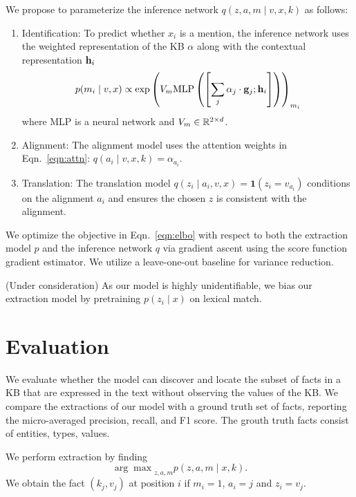 \documentclass[12pt]{article}
\begin{document}
We propose to parameterize the inference network $q(z,a,m\mid v,x,k)$ as follows:
\begin{enumerate}
\item Identification: To predict whether $x_i$ is a mention,
    the inference network uses the weighted representation of the KB $\alpha$
    along with the contextual representation $\mathbf{h}_i$
    \begin{equation}
    p(m_i \mid v,x) \propto
    \exp\left(V_m
    \textrm{MLP}\left(\left[\sum_j \alpha_j \cdot \mathbf{g}_j; \mathbf{h}_i\right]\right)\right)_{m_i}
    \end{equation}
    where MLP is a neural network and $V_m \in \mathbb{R}^{2 \times d}$.
\item Alignment: The alignment model uses the attention weights in Eqn.~\ref{eqn:attn}:
    $q(a_i \mid v,x,k) = \alpha_{a_i}$.
\item Translation: The translation model
    $q(z_i \mid a_i,v,x) = \mathbf{1}(z_i = v_{a_i})$
    conditions on the alignment $a_i$ and ensures the chosen $z$ is consistent
    with the alignment. 
\end{enumerate}

We optimize the objective in Eqn.~\ref{eqn:elbo}
with respect to both the extraction model $p$ and the inference network $q$
via gradient ascent using the score function gradient estimator.
We utilize a leave-one-out baseline for variance reduction.

(Under consideration)
As our model is highly unidentifiable,
we bias our extraction model by pretraining $p(z_i \mid x)$ on lexical match.

\section{Evaluation}
We evaluate whether the model can discover
and locate the subset of facts in a KB that are expressed in the text
without observing the values of the KB.
We compare the extractions of our model with a ground truth set of facts,
reporting the micro-averaged precision, recall, and F1 score.
The grouth truth facts consist of entities, types, values.

We perform extraction by finding
$${\arg\max}_{z,a,m} p(z,a,m\mid x,k).$$
We obtain the fact $(k_j, v_j)$ at position $i$ if $m_i=1$,
$a_i = j$ and $z_i = v_j$.
\end{document}
